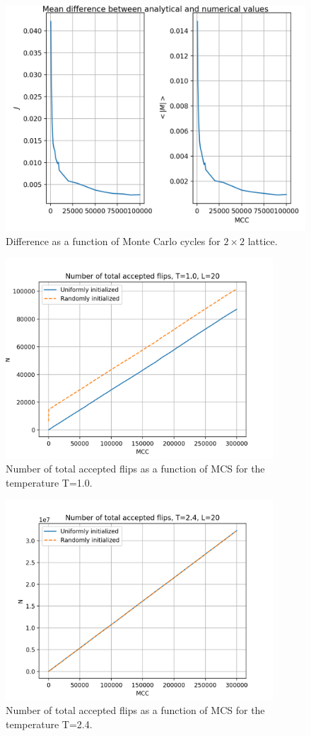 \documentclass{article}
\begin{document}
\begin{figure}[H]
	\centering
	\includegraphics[width=\linewidth]{Diff_vs_mcs.png}
	\caption{Difference as a function of Monte Carlo cycles for $2\times2$ lattice.}
	\label{fig:diff_mc}
\end{figure}

\begin{figure}[H]
	\centering
	\includegraphics[width=100mm]{n_flips_1.png}
	\caption{Number of total accepted flips as a function of MCS for the temperature T=1.0.}
	\label{fig:n1}
\end{figure}

\begin{figure}[H]
	\centering
	\includegraphics[width=100mm]{n_flips_24.png}
	\caption{Number of total accepted flips as a function of MCS for the temperature T=2.4.}
	\label{fig:n24}
\end{figure}
\end{document}
